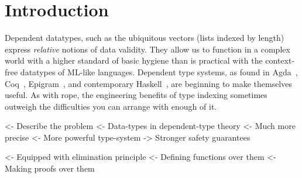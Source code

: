 \documentclass[preprint
              , authoryear
              ]{sigplanconf}
\newenvironment{wstructure}{\comment}{\endcomment}
\begin{document}

\section{Introduction}

Dependent datatypes, such as the ubiquitous vectors (lists indexed by
length) express \emph{relative} notions of data validity. They allow
us to function in a complex world with a higher standard of basic
hygiene than is practical with the context-free datatypes of ML-like
languages. Dependent type systems, as found in
Agda~\cite{norell:agda}, Coq~\cite{coq},
Epigram~\cite{mcbride.mckinna:view-from-the-left}, and contemporary
Haskell~\cite{spj:gadt}, are beginning to make themselves useful. As
with rope, the engineering benefits of type indexing sometimes
outweigh the difficulties you can arrange with enough of it.


\begin{wstructure}
<- Describe the problem
    <- Data-types in dependent-type theory
        <- Much more precise
            <- More powerful type-system
            -> Stronger safety guarantees
\end{wstructure}


\begin{wstructure}
        <- Equipped with elimination principle
            <- Defining functions over them
            <- Making proofs over them
\end{wstructure}
\end{document}
